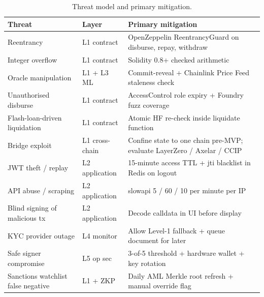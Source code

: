 \documentclass[12pt,a4paper]{report}
\begin{document}
\begin{table}[!t]
\centering
\caption{Threat model and primary mitigation.}
\label{tab:threats}
\small
\begin{tabularx}{\linewidth}{@{}p{3.0cm}YY@{}}
\toprule
\textbf{Threat} & \textbf{Layer} & \textbf{Primary mitigation} \\
\midrule
Reentrancy & L1 contract & OpenZeppelin ReentrancyGuard on disburse, repay, withdraw \\
Integer overflow & L1 contract & Solidity 0.8+ checked arithmetic \\
Oracle manipulation & L1 + L3 ML & Commit-reveal + Chainlink Price Feed staleness check \\
Unauthorised disburse & L1 contract & AccessControl role expiry + Foundry fuzz coverage \\
Flash-loan-driven liquidation~\cite{wu2024flashLoan} & L1 contract & Atomic HF re-check inside liquidate function \\
Bridge exploit & L1 cross-chain & Confine state to one chain pre-MVP; evaluate LayerZero / Axelar / CCIP \\
JWT theft / replay & L2 application & 15-minute access TTL + jti blacklist in Redis on logout \\
API abuse / scraping & L2 application & slowapi 5 / 60 / 10 per minute per IP \\
Blind signing of malicious tx & L2 application & Decode calldata in UI before display \\
KYC provider outage & L4 monitor & Allow Level-1 fallback + queue document for later \\
Safe signer compromise & L5 op sec & 3-of-5 threshold + hardware wallet + key rotation \\
Sanctions watchlist false negative & L1 + ZKP & Daily AML Merkle root refresh + manual override flag \\
\bottomrule
\end{tabularx}
\end{table}
\end{document}
